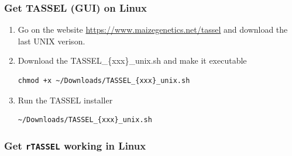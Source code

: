 \hypertarget{get-tassel-gui-on-linux}{%
  \subsubsection{Get TASSEL (GUI) on
    Linux}\label{get-tassel-gui-on-linux}}

\begin{enumerate}
  \def\labelenumi{\arabic{enumi}.}
  \item
        Go on the website \url{https://www.maizegenetics.net/tassel} and
        download the last UNIX verison.
  \item
        Download the TASSEL\_\{xxx\}\_unix.sh and make it executable

        \begin{verbatim}
chmod +x ~/Downloads/TASSEL_{xxx}_unix.sh
\end{verbatim}
  \item
        Run the TASSEL installer

        \begin{verbatim}
~/Downloads/TASSEL_{xxx}_unix.sh
\end{verbatim}
\end{enumerate}

\hypertarget{get-rtassel-working-in-linux}{%
  \subsubsection{\texorpdfstring{Get \texttt{rTASSEL} working in
      Linux}{Get rTASSEL working in Linux}}\label{get-rtassel-working-in-linux}}

